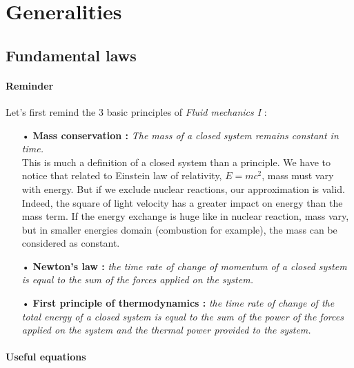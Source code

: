 
\chapter{Generalities}
\section{Fundamental laws}
\subsubsection{Reminder}
	Let's first remind the 3 basic principles of \textit{Fluid mechanics I} : \\
	
	\begin{itemize}
		\item[•] \textbf{Mass conservation :} \textit{The mass of a closed system remains constant in time.}\\
		This is much a definition of a closed system than a principle. We have to notice that related to Einstein law of relativity, $E = mc^2$, mass must vary with energy. But if we exclude nuclear reactions, our approximation is valid. Indeed, the square of light velocity has a greater impact on energy than the mass term. If the energy exchange is huge like in nuclear reaction, mass vary, but in smaller energies domain (combustion for example), the mass can be considered as constant. \\
		
		\item[•] \textbf{Newton's law :} \textit{the time rate of change of momentum of a closed system is equal to the sum of the forces applied on the system.} \\
		
		\item[•] \textbf{First principle of thermodynamics :} \textit{the time rate of change of the total energy of a closed system is equal to the sum of the power of the forces applied on the system and the thermal power provided to the system.}
	\end{itemize}		
	
	\subsubsection{Useful equations}
	
